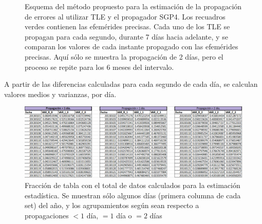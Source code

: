 \begin{figure}[!h]
\centering
{}
\caption[Descripci\'on del m\'etodo propuesto para la propagaci\'on de errores]{Esquema del m\'etodo propuesto para la estimaci\'on de la propagaci\'on de errores al utilizar TLE y el propagador SGP4. Los recuadros verdes contienen las efem\'erides precisas. Cada uno de los TLE se propagan para cada segundo, durante 7 d\'ias hacia adelante, y se comparan los valores de cada instante propagado con las efem\'erides precisas. Aqu\'i s\'olo se muestra la propagaci\'on de 2 d\'ias, pero el proceso se repite para los 6 meses del intervalo.}
\label{fig:metodotabla}
\end{figure}

A partir de las diferencias calculadas para cada segundo de cada d\'ia, se calculan valores medios y varianzas, por d\'ia.\\


\begin{figure}[!h]
\centering
\includegraphics[width=\textwidth]{imagenes/tablacompleta}
\caption[Tabla de Estimaci\'on de errores.]{Fracci\'on de tabla con el total de datos calculados para la estimaci\'on estad\'istica. Se muestran s\'olo algunos d\'ias (primera columna de cada set) del a\~no, y los agrupamientos seg\'un sean respecto a propagaciones $< 1$ d\'ia, $= 1$ d\'ia o $= 2$ d\'ias}
\label{fig:tablacompleta}
\end{figure}

